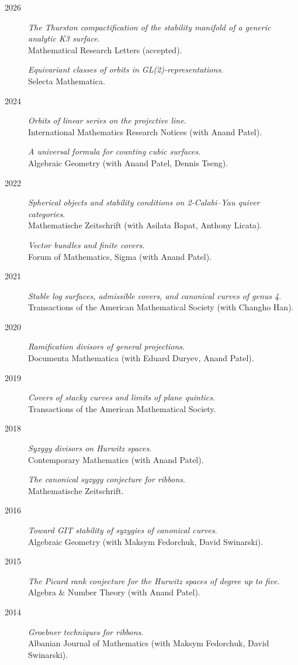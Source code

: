 \documentclass[11pt]{article}
\begin{document}
\label{org87b74db}
\begin{description}
\item[{2026}] \emph{The Thurston compactification of the stability manifold of a generic analytic K3 surface}.\\
Mathematical Research Letters (accepted).

\emph{Equivariant classes of orbits in GL(2)-representations}.\\
Selecta Mathematica.
\item[{2024}] \emph{Orbits of linear series on the projective line}.\\
International Mathematics Research Notices (with Anand Patel).

\emph{A universal formula for counting cubic surfaces}.\\
Algebraic Geometry (with Anand Patel, Dennis Tseng).
\item[{2022}] \emph{Spherical objects and stability conditions on 2-Calabi--Yau quiver categories}.\\
Mathematische Zeitschrift (with Asilata Bapat, Anthony Licata).

\emph{Vector bundles and finite covers}.\\
Forum of Mathematics, Sigma (with Anand Patel).
\item[{2021}] \emph{Stable log surfaces, admissible covers, and canonical curves of genus 4}.\\
Transactions of the American Mathematical Society (with Changho Han).
\item[{2020}] \emph{Ramification divisors of general projections}.\\
Documenta Mathematica (with Eduard Duryev, Anand Patel).
\item[{2019}] \emph{Covers of stacky curves and limits of plane quintics}.\\
Transactions of the American Mathematical Society.
\item[{2018}] \emph{Syzygy divisors on Hurwitz spaces}.\\
Contemporary Mathematics (with Anand Patel).

\emph{The canonical syzygy conjecture for ribbons}.\\
Mathematische Zeitschrift.
\item[{2016}] \emph{Toward GIT stability of syzygies of canonical curves}.\\
Algebraic Geometry (with Maksym Fedorchuk, David Swinarski).
\item[{2015}] \emph{The Picard rank conjecture for the Hurwitz spaces of degree up to five}.\\
Algebra \& Number Theory (with Anand Patel).
\item[{2014}] \emph{Groebner techniques for ribbons}.\\
Albanian Journal of Mathematics (with Maksym Fedorchuk, David Swinarski).


\end{description}
\end{document}
